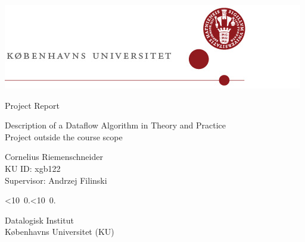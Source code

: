 \begin{titlepage}
\begin{center}
    \includegraphics[scale=1]{./logos/Logo2a.jpg}
\end{center}
\vspace{2cm}

\begin{center} \large

Project Report
\vspace{1cm}

{\Huge Description of a Dataflow Algorithm in Theory and Practice}\\
\vphantom{p}
Project outside the course scope
\vspace{2.5cm}

Cornelius Riemenschneider\\
KU ID: xgb122\\
Supervisor: Andrzej Filinski
\vspace{1.5cm}

\def\mydate{\leavevmode\hbox{\twodigits\day.\twodigits\month.\the\year}}
\def\twodigits#1{\ifnum#1<10 0\fi\the#1}
\mydate
\vspace{1cm}

Datalogisk Institut\\
Københavns Universitet (KU)
\end{center}
\end{titlepage}
